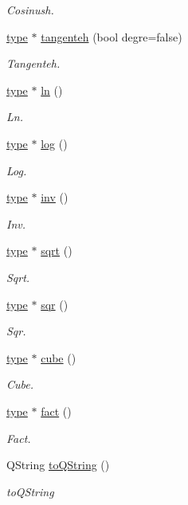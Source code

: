 \begin{DoxyCompactItemize}
\begin{DoxyCompactList}\small\item\em Cosinush. \end{DoxyCompactList}\item 
\hyperlink{classtype}{type} $\ast$ \hyperlink{classentier_abd47ffc368af385550ed2db6ce289ded}{tangenteh} (bool degre=false)
\begin{DoxyCompactList}\small\item\em Tangenteh. \end{DoxyCompactList}\item 
\hyperlink{classtype}{type} $\ast$ \hyperlink{classentier_aef2c65b9f379c5ea7857fcaabca30dba}{ln} ()
\begin{DoxyCompactList}\small\item\em Ln. \end{DoxyCompactList}\item 
\hyperlink{classtype}{type} $\ast$ \hyperlink{classentier_aeca6cf72ceaa32cfc7b52f00d962d3cc}{log} ()
\begin{DoxyCompactList}\small\item\em Log. \end{DoxyCompactList}\item 
\hyperlink{classtype}{type} $\ast$ \hyperlink{classentier_abaa5775172cf9c417ccdb174304056b3}{inv} ()
\begin{DoxyCompactList}\small\item\em Inv. \end{DoxyCompactList}\item 
\hyperlink{classtype}{type} $\ast$ \hyperlink{classentier_a9058b76c3fae96fb3a9ade24e6c33926}{sqrt} ()
\begin{DoxyCompactList}\small\item\em Sqrt. \end{DoxyCompactList}\item 
\hyperlink{classtype}{type} $\ast$ \hyperlink{classentier_a33b0b2b13a0fdc767a809df33b934dd6}{sqr} ()
\begin{DoxyCompactList}\small\item\em Sqr. \end{DoxyCompactList}\item 
\hyperlink{classtype}{type} $\ast$ \hyperlink{classentier_a4c726d947d2f7464ec858f50054118e8}{cube} ()
\begin{DoxyCompactList}\small\item\em Cube. \end{DoxyCompactList}\item 
\hyperlink{classtype}{type} $\ast$ \hyperlink{classentier_a8a475a326fc2c4e1b2a03ec437270144}{fact} ()
\begin{DoxyCompactList}\small\item\em Fact. \end{DoxyCompactList}\item 
Q\-String \hyperlink{classentier_a47b7c0d899f24e9117e123165648686b}{to\-Q\-String} ()
\begin{DoxyCompactList}\small\item\em to\-Q\-String \end{DoxyCompactList}\end{DoxyCompactItemize}


